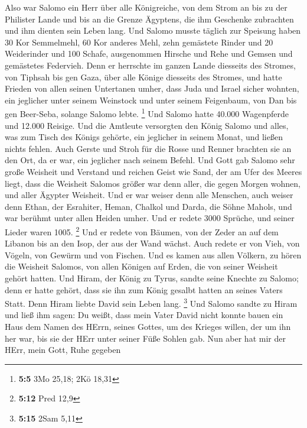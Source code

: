  Also war Salomo ein Herr über alle Königreiche, von dem
Strom an bis zu der Philister Lande und bis an die Grenze Ägyptens, die
ihm Geschenke zubrachten und ihm dienten sein Leben lang. 
Und Salomo musste täglich zur Speisung haben 30 Kor Semmelmehl, 60 Kor
anderes Mehl,  zehn gemästete Rinder und 20 Weiderinder
und 100 Schafe, ausgenommen Hirsche und Rehe und Gemsen und gemästetes
Federvieh.  Denn er herrschte im ganzen Lande diesseits
des Stromes, von Tiphsah bis gen Gaza, über alle Könige diesseits des
Stromes, und hatte Frieden von allen seinen Untertanen umher,
 dass Juda und Israel sicher wohnten, ein jeglicher unter
seinem Weinstock und unter seinem Feigenbaum, von Dan bis gen Beer-Seba,
solange Salomo lebte. \footnote{\textbf{5:5} 3Mo 25,18; 2Kö 18,31}
 Und Salomo hatte 40.000 Wagenpferde und 12.000 Reisige.
 Und die Amtleute versorgten den König Salomo und alles,
was zum Tisch des Königs gehörte, ein jeglicher in seinem Monat, und
ließen nichts fehlen.  Auch Gerste und Stroh für die Rosse
und Renner brachten sie an den Ort, da er war, ein jeglicher nach seinem
Befehl.  Und Gott gab Salomo sehr große Weisheit und
Verstand und reichen Geist wie Sand, der am Ufer des Meeres liegt,
 dass die Weisheit Salomos größer war denn aller, die
gegen Morgen wohnen, und aller Ägypter Weisheit.  Und er
war weiser denn alle Menschen, auch weiser denn Ethan, der Esrahiter,
Heman, Chalkol und Darda, die Söhne Mahols, und war berühmt unter allen
Heiden umher.  Und er redete 3000 Sprüche, und seiner
Lieder waren 1005. \footnote{\textbf{5:12} Pred 12,9} 
Und er redete von Bäumen, von der Zeder an auf dem Libanon bis an den
Isop, der aus der Wand wächst. Auch redete er von Vieh, von Vögeln, von
Gewürm und von Fischen.  Und es kamen aus allen Völkern,
zu hören die Weisheit Salomos, von allen Königen auf Erden, die von
seiner Weisheit gehört hatten.  Und Hiram, der König zu
Tyrus, sandte seine Knechte zu Salomo; denn er hatte gehört, dass sie
ihn zum König gesalbt hatten an seines Vaters Statt. Denn Hiram liebte
David sein Leben lang. \footnote{\textbf{5:15} 2Sam 5,11}
 Und Salomo sandte zu Hiram und ließ ihm sagen:
 Du weißt, dass mein Vater David nicht konnte bauen ein
Haus dem Namen des HErrn, seines Gottes, um des Krieges willen, der um
ihn her war, bis sie der HErr unter seiner Füße Sohlen gab.
 Nun aber hat mir der HErr, mein Gott, Ruhe gegeben
